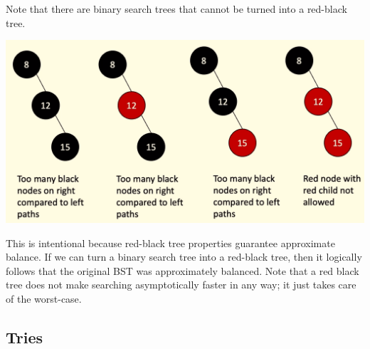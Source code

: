   Note that there are binary search trees that cannot be turned into a red-black tree. 
  \begin{center}
    \includegraphics[scale=0.3]{img/impossible_red_black.png}
  \end{center}

  This is intentional because red-black tree properties guarantee approximate balance. If we can turn a binary search tree into a red-black tree, then it logically follows that the original BST was approximately balanced. Note that a red black tree does not make searching asymptotically faster in any way; it just takes care of the worst-case. 

\subsection{Tries}

